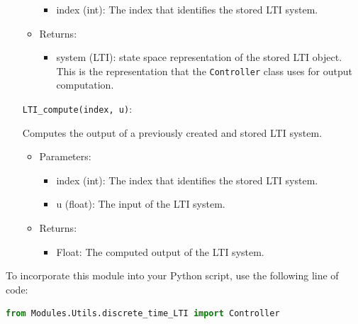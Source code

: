 \documentclass[12pt]{report}
\begin{document}
\begin{itemize}
\begin{itemize}
\begin{itemize}
\item index (int): The index that identifies the stored LTI system.
\end{itemize}

\item Returns:

\begin{itemize}

\item system (LTI): state space representation of the stored LTI object. This is the representation that the \texttt{Controller} class uses for output computation.

\end{itemize}

\end{itemize}

\texttt{LTI\_compute(index, u)}:

Computes the output of a previously created and stored LTI system.

\begin{itemize}
\item Parameters:

\begin{itemize}

\item index (int): The index that identifies the stored LTI system.

\item u (float): The input of the LTI system.

\end{itemize}

\item Returns:

\begin{itemize}

\item Float: The computed output of the LTI system.

\end{itemize}

\end{itemize}

\end{itemize}

To incorporate this module into your Python script, use the following line of code:

\begin{lstlisting}[language = Python]
from Modules.Utils.discrete_time_LTI import Controller
\end{lstlisting}
\end{document}
